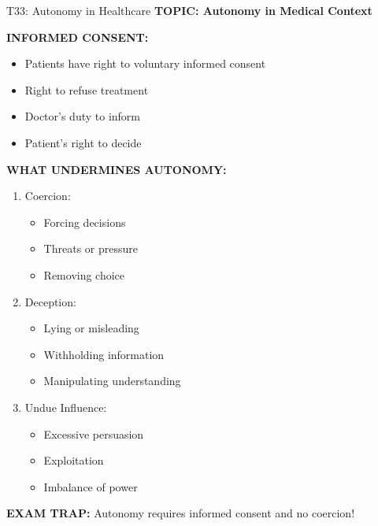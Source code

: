 \documentclass[8pt]{beamer}
\begin{document}
	\begin{frame}{T33: Autonomy in Healthcare}
		\fontsize{6.5}{7.5}\selectfont
		\textbf{TOPIC: Autonomy in Medical Context}
		
		\vspace{0.1cm}
		\textbf{INFORMED CONSENT:}
		\begin{itemize}
			\item Patients have right to voluntary informed consent
			\item Right to refuse treatment
			\item Doctor's duty to inform
			\item Patient's right to decide
		\end{itemize}
		
		\vspace{0.1cm}
		\textbf{WHAT UNDERMINES AUTONOMY:}
		\begin{enumerate}
			\item \textcolor{myblue}{Coercion:}
			\begin{itemize}
				\item Forcing decisions
				\item Threats or pressure
				\item Removing choice
			\end{itemize}
			\item \textcolor{myblue}{Deception:}
			\begin{itemize}
				\item Lying or misleading
				\item Withholding information
				\item Manipulating understanding
			\end{itemize}
			\item \textcolor{myblue}{Undue Influence:}
			\begin{itemize}
				\item Excessive persuasion
				\item Exploitation
				\item Imbalance of power
			\end{itemize}
		\end{enumerate}
		
		\textcolor{myred}{\textbf{EXAM TRAP:}} Autonomy requires \textcolor{myblue}{informed consent and no coercion}!
	\end{frame}
	
\end{document}
